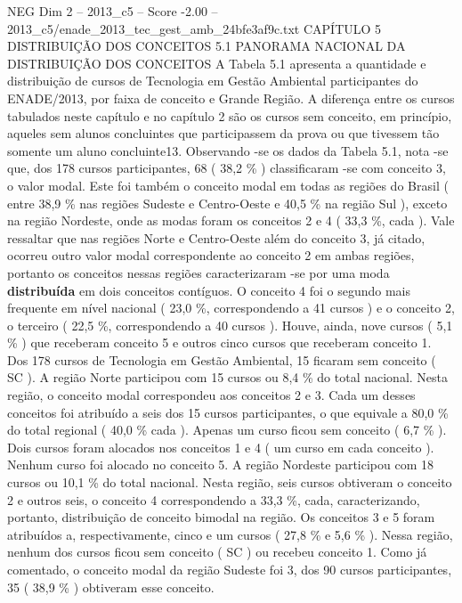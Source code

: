 \begin{textsample}{NEG Dim 2 – 2013\_c5 – Score -2.00 – 2013\_c5/enade\_2013\_tec\_gest\_amb\_24bfe3af9c.txt}  \label{ex:f2_neg_070}
CAPÍTULO 5 DISTRIBUIÇÃO DOS CONCEITOS 5.1 PANORAMA NACIONAL DA DISTRIBUIÇÃO DOS CONCEITOS A Tabela 5.1 apresenta a quantidade e distribuição de cursos de Tecnologia em Gestão Ambiental participantes do ENADE/2013, por faixa de conceito e Grande Região.
A diferença entre os cursos tabulados neste capítulo e no capítulo 2 são os cursos sem conceito, em princípio, aqueles sem alunos concluintes que participassem da prova ou que tivessem tão somente um aluno concluinte13.
Observando -se os dados da Tabela 5.1, nota -se que, dos 178 cursos participantes, 68 ( 38,2 \% ) classificaram -se com conceito 3, o valor modal.
Este foi também o conceito modal em todas as regiões do Brasil ( entre 38,9 \% nas regiões Sudeste e Centro-Oeste e 40,5 \% na região Sul ), exceto na região Nordeste, onde as modas foram os conceitos 2 e 4 ( 33,3 \%, cada ).
Vale ressaltar que nas regiões Norte e Centro-Oeste além do conceito 3, já citado, ocorreu outro valor modal correspondente ao conceito 2 em ambas regiões, portanto os conceitos nessas regiões caracterizaram -se por uma moda \textbf{distribuída} em dois conceitos contíguos.
O conceito 4 foi o segundo mais frequente em nível nacional ( 23,0 \%, correspondendo a 41 cursos ) e o conceito 2, o terceiro ( 22,5 \%, correspondendo a 40 cursos ).
Houve, ainda, nove cursos ( 5,1 \% ) que receberam conceito 5 e outros cinco cursos que receberam conceito 1.
Dos 178 cursos de Tecnologia em Gestão Ambiental, 15 ficaram sem conceito ( SC ).
A região Norte participou com 15 cursos ou 8,4 \% do total nacional.
Nesta região, o conceito modal correspondeu aos conceitos 2 e 3.
Cada um desses conceitos foi atribuído a seis dos 15 cursos participantes, o que equivale a 80,0 \% do total regional ( 40,0 \% cada ).
Apenas um curso ficou sem conceito ( 6,7 \% ).
Dois cursos foram alocados nos conceitos 1 e 4 ( um curso em cada conceito ).
Nenhum curso foi alocado no conceito 5.
A região Nordeste participou com 18 cursos ou 10,1 \% do total nacional.
Nesta região, seis cursos obtiveram o conceito 2 e outros seis, o conceito 4 correspondendo a 33,3 \%, cada, caracterizando, portanto, distribuição de conceito bimodal na região.
Os conceitos 3 e 5 foram atribuídos a, respectivamente, cinco e um cursos ( 27,8 \% e 5,6 \% ).
Nessa região, nenhum dos cursos ficou sem conceito ( SC ) ou recebeu conceito 1.
Como já comentado, o conceito modal da região Sudeste foi 3, dos 90 cursos participantes, 35 ( 38,9 \% ) obtiveram esse conceito.

\end{textsample}

